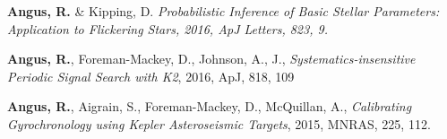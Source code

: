 \documentclass[12pt,letterpaper]{article}
\begin{document}

\begin{list}{}{\cvlist}
\item
    {\bf Angus, R.} \& Kipping, D. {\it Probabilistic Inference of Basic
    Stellar Parameters: Application to Flickering Stars, 2016, ApJ Letters,
    823, 9.}
\item
    {\bf Angus, R.}, Foreman-Mackey, D., Johnson, A., J., {\it
    Systematics-insensitive Periodic Signal Search with K2}, 2016, ApJ, 818,
    109
\item
    {\bf Angus, R.}, Aigrain, S., Foreman-Mackey, D., McQuillan, A., {\it
    Calibrating Gyrochronology using Kepler Asteroseismic Targets}, 2015,
    MNRAS, 225, 112.
\end{list}
\end{document}
